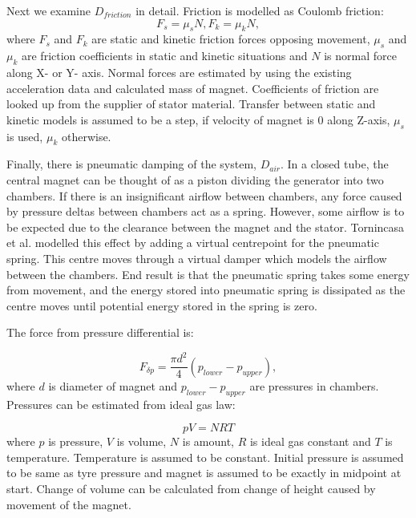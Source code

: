 Next we examine $D_{friction}$ in detail. Friction is modelled as Coulomb friction:
\begin{equation}\label{eq:Coulomb_friction}
  F_s = \mu_sN,
  F_k = \mu_kN,
\end{equation}
where $F_s $ and $ F_k $ are static and kinetic friction forces opposing movement, $\mu_s$ and $\mu_k$ are friction coefficients in static and kinetic situations and $N$ is normal force along X- or Y- axis. Normal forces are estimated by using the existing acceleration data and calculated mass of magnet. Coefficients of friction are looked up from the supplier of stator material. Transfer between static and kinetic models is assumed to be a step, if velocity of magnet is 0 along Z-axis, $\mu_s$ is used, $\mu_k$ otherwise.

Finally, there is pneumatic damping of the system, $D_{air}$. In a closed tube, the central magnet can be thought of as a piston dividing the generator into two chambers. If there is an insignificant airflow between chambers, any force caused by pressure deltas between chambers act as a spring. However, some airflow is to be expected due to the clearance between the magnet and the stator. Tornincasa et al. \cite{Tornincasa2012} modelled this effect by adding a virtual centrepoint for the pneumatic spring. This centre moves through a virtual damper which models the airflow between the chambers. End result is that the pneumatic spring takes some energy from movement, and the energy stored into pneumatic spring is dissipated as the centre moves until potential energy stored in the spring is zero. 

The force from pressure differential is:

\begin{equation}
  F_{\delta p} = \frac{\pi d^2}{4}(p_{lower}-p_{upper}),
\end{equation}
where $d$ is diameter of magnet and $p_{lower}-p_{upper}$ are pressures in chambers. Pressures can be estimated from ideal gas law:

\begin{equation}
  pV = NRT
\end{equation}
where $p$ is pressure, $V$ is volume, $N$ is amount, $R$ is ideal gas constant and $T$ is temperature. Temperature is assumed to be constant. Initial pressure is assumed to be same as tyre pressure and magnet is assumed to be exactly in midpoint at start. Change of volume can be calculated from change of height caused by movement of the magnet. 

